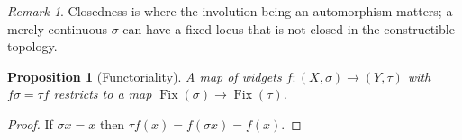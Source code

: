 \documentclass{amsart}
\providecommand{\uses}[1]{}
\providecommand{\incomplete}[1]{}
\theoremstyle{plain}
\newtheorem{proposition}[theorem]{Proposition}
\theoremstyle{definition}
\theoremstyle{remark}
\newtheorem{remark}[theorem]{Remark}
\newcommand{\Fix}{\operatorname{Fix}}
\begin{document}
\begin{remark}\label{dm-0004}
Closedness is where the involution being an automorphism matters; a merely continuous $\sigma$ can have a fixed locus that is not closed in the constructible topology.
\end{remark}

\begin{proposition}[Functoriality]\label{dm-0005}
A map of widgets $f\colon (X,\sigma)\to(Y,\tau)$ with $f\sigma = \tau f$ restricts to a map $\Fix(\sigma)\to\Fix(\tau)$.
\end{proposition}
\begin{proof}
\uses{dm-0001}
If $\sigma x = x$ then $\tau f(x) = f(\sigma x) = f(x)$. \incomplete{Say why the restriction is continuous when $X$ carries the constructible topology.}
\end{proof}



\end{document}

